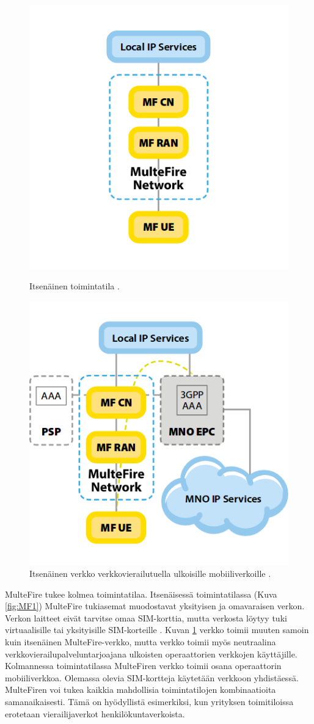 \documentclass[finnish, 12pt, a4paper, elec, latin1, utf8, online]{aaltothesis}
\begin{document}
\begin{figure}[h!]
    \begin{minipage}{0.5\textwidth}
        \centering
        \includegraphics[width=0.5\linewidth]{Images/MF1.png}
        \caption{Itsenäinen toimintatila \cite{chambers2016multefire}.}
        \label{fig:MF1}
    \end{minipage}
    \begin{minipage}{0.5\textwidth}
        \centering
        \includegraphics[width=0.5\linewidth]{Images/MF2.png}
        \caption{Itsenäinen verkko verkkovierailutuella ulkoisille mobiiliverkoille \cite{chambers2016multefire}.}
        \label{fig:MF2}
    \end{minipage}
\end{figure}

MulteFire tukee kolmea toimintatilaa. Itsenäisessä toimintatilassa (Kuva \ref{fig:MF1}) MulteFire tukiasemat muodostavat yksityisen ja omavaraisen verkon. Verkon laitteet eivät tarvitse omaa SIM-korttia, mutta verkosta löytyy tuki virtuaalisille tai yksityisille SIM-korteille \cite{chambers2016multefire}. Kuvan \ref{fig:MF2} verkko toimii muuten samoin kuin itsenäinen MulteFire-verkko, mutta verkko toimii myös neutraalina verkkovierailupalveluntarjoajana ulkoisten operaattorien verkkojen käyttäjille. Kolmannessa toimintatilassa MulteFiren verkko toimii osana operaattorin mobiiliverkkoa. Olemassa olevia SIM-kortteja käytetään verkkoon yhdistäessä. MulteFiren voi tukea kaikkia mahdollisia toimintatilojen kombinaatioita samanaikaisesti. Tämä on hyödyllistä esimerkiksi, kun yrityksen toimitiloissa erotetaan vierailijaverkot henkilökuntaverkoista.
\end{document}
